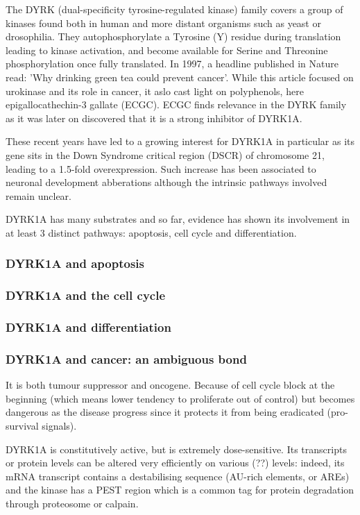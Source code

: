 \documentclass[onecolumn,10pt]{asme2ej}
\begin{document}
The DYRK (dual-specificity tyrosine-regulated kinase) family covers a group of kinases found both in human and more distant organisms such as yeast or drosophilia. They autophosphorylate a Tyrosine (Y) residue during translation leading to kinase activation, and become available for Serine and Threonine phosphorylation once fully translated. 
In 1997, a headline published in Nature read: 'Why drinking green tea could prevent cancer'. While this article focused on urokinase and its role in cancer, it aslo cast light on polyphenols, here epigallocathechin-3 gallate (ECGC). ECGC finds relevance in the DYRK family as it was later on discovered that it is a strong inhibitor of DYRK1A.

These recent years have led to a growing interest for DYRK1A in particular as its gene sits in the Down Syndrome critical region (DSCR) of chromosome 21, leading to a 1.5-fold overexpression. Such increase has been associated to neuronal development abberations although the intrinsic pathways involved remain unclear. 

DYRK1A has many substrates and so far, evidence has shown its involvement in at least 3 distinct pathways: apoptosis, cell cycle and differentiation.

\subsubsection{DYRK1A and apoptosis}
\subsubsection{DYRK1A and the cell cycle}
\subsubsection{DYRK1A and differentiation}



\subsubsection{DYRK1A and cancer: an ambiguous bond}
It is both tumour suppressor and oncogene. Because of cell cycle block at the beginning (which means lower tendency to proliferate out of control) but becomes dangerous as the disease progress since it protects it from being eradicated (pro-survival signals). 

DYRK1A is constitutively active, but is extremely dose-sensitive. Its transcripts or protein levels can be altered very efficiently on various (??) levels: indeed, its mRNA transcript contains a destabilising sequence (AU-rich elements, or AREs) and the kinase has a PEST region which is a common tag for protein degradation through proteosome or calpain. 
\end{document}
